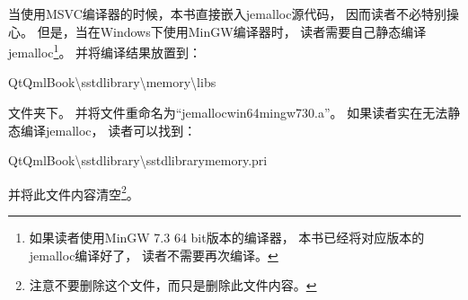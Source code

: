 当使用MSVC编译器的时候，本书直接嵌入jemalloc源代码，
因而读者不必特别操心。
但是，当在Windows下使用MinGW编译器时，
读者需要自己静态编译jemalloc\footnote{
如果读者使用MinGW 7.3 64 bit版本的编译器，
本书已经将对应版本的jemalloc编译好了，
读者不需要再次编译。
}。
并将编译结果放置到：
\begin{littlelongworld}
QtQmlBook\textbackslash{}sstd\underline{\hspace{0.5em}}library\textbackslash{}memory\textbackslash{}libs
\end{littlelongworld}
文件夹下。
并将文件重命名为“jemalloc\underline{\hspace{0.5em}}win64\underline{\hspace{0.5em}}mingw\underline{\hspace{0.5em}}730.a”。
如果读者实在无法静态编译jemalloc，
读者可以找到：
\begin{littlelongworld}
QtQmlBook\textbackslash{}sstd\underline{\hspace{0.5em}}library\textbackslash{}\underline{\hspace{0.5em}}sstd\underline{\hspace{0.5em}}library\underline{\hspace{0.5em}}memory.pri
\end{littlelongworld}
并将此文件内容清空\footnote{
注意不要删除这个文件，而只是删除此文件内容。
}。





















